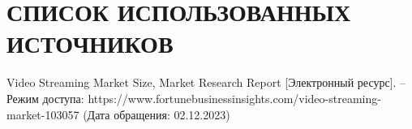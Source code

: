 \section*{СПИСОК ИСПОЛЬЗОВАННЫХ ИСТОЧНИКОВ}

\begingroup
\renewcommand{\section}[2]{}
\begin{thebibliography}{}
	 Video Streaming Market Size, Market Research Report [Электронный ресурс]. -- Режим доступа: https://www.fortunebusinessinsights.com/video-streaming-market-103057 (Дата обращения: 02.12.2023)
	
\end{thebibliography}
\endgroup

\pagebreak